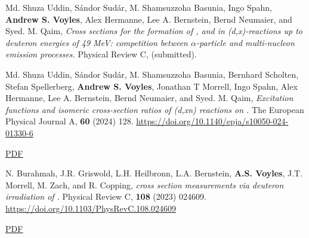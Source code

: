 \begin{bibsection}

\item Md. Shuza Uddin, Sándor Sudár, M. Shamsuzzoha Basunia, Ingo Spahn, \textbf{Andrew S. Voyles}, Alex Hermanne, Lee A. Bernstein, Bernd Neumaier, and Syed. M. Qaim, \emph{Cross sections for the formation of ,  and  in (d,x)-reactions up to deuteron energies of 49 MeV: competition between $\alpha$-particle and multi-nucleon emission processes.} Physical Review C, (submitted).


\item Md. Shuza Uddin, Sándor Sudár, M. Shamsuzzoha Basunia, Bernhard Scholten, Stefan Spellerberg, \textbf{Andrew S. Voyles}, Jonathan T Morrell, Ingo Spahn, Alex Hermanne, Lee A. Bernstein, Bernd Neumaier, and Syed. M. Qaim, \emph{ Excitation functions and isomeric cross-section ratios of (d,xn) reactions on .} The European Physical Journal A, \textbf{60} (2024) 128. \url{https://doi.org/10.1140/epja/s10050-024-01330-6}

\ifshort \vspace{0.1cm} \href{https://avoyles.github.io/papers/Uddin2024_86Y.pdf}{\underline{PDF}} \else  \fi



\item N. Burahmah, J.R. Griswold, L.H. Heilbronn, L.A. Bernstein,  \textbf{A.S. Voyles}, J.T. Morrell, M. Zach, and R. Copping, \emph{     cross section measurements via deuteron irradiation of  .} Physical Review C, \textbf{108} (2023) 024609. \url{https://doi.org/10.1103/PhysRevC.108.024609} 

\ifshort \vspace{0.1cm} \href{https://avoyles.github.io/papers/Buramah2023_229Pa_deuterons.pdf}{\underline{PDF}} \else  \fi 


\end{bibsection}
